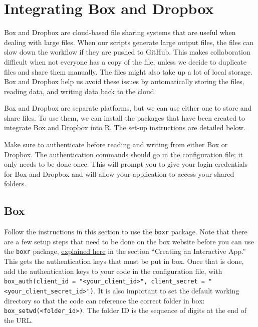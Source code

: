 \documentclass[
]{book}
\begin{document}
\section{Integrating Box and Dropbox}\label{integrating-box-and-dropbox}

Box and Dropbox are cloud-based file sharing systems that are useful when dealing with large files. When our scripts generate large output files, the files can slow down the workflow if they are pushed to GitHub. This makes collaboration difficult when not everyone has a copy of the file, unless we decide to duplicate files and share them manually. The files might also take up a lot of local storage. Box and Dropbox help us avoid these issues by automatically storing the files, reading data, and writing data back to the cloud.

Box and Dropbox are separate platforms, but we can use either one to store and share files. To use them, we can install the packages that have been created to integrate Box and Dropbox into R. The set-up instructions are detailed below.

Make sure to authenticate before reading and writing from either Box or Dropbox. The authentication commands should go in the configuration file; it only needs to be done once. This will prompt you to give your login credentials for Box and Dropbox and will allow your application to access your shared folders.

\subsection{Box}\label{box}

Follow the instructions in this section to use the \texttt{boxr} package. Note that there are a few setup steps that need to be done on the box website before you can use the \texttt{boxr} package, \href{https://r-box.github.io/boxr/articles/boxr-app-interactive.html\#create}{explained here} in the section ``Creating an Interactive App.'' This gets the authentication keys that must be put in box.
Once that is done, add the authentication keys to your code in the configuration file, with \texttt{box\_auth(client\_id\ =\ "\textless{}your\_client\_id\textgreater{}",\ client\_secret\ =\ "\textless{}your\_client\_secret\_id\textgreater{}")}. It is also important to set the default working directory so that the code can reference the correct folder in box: \texttt{box\_setwd(\textless{}folder\_id\textgreater{})}. The folder ID is the sequence of digits at the end of the URL.
\end{document}
